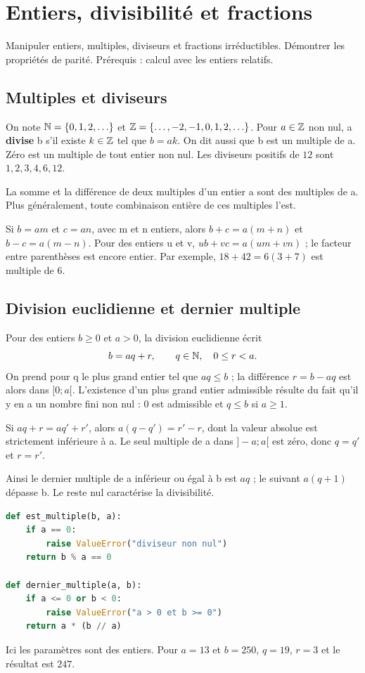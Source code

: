 \documentclass[../cours_2de.tex]{subfiles}
\begin{document}
\setcounter{chapter}{1}
\chapter{Entiers, divisibilité et fractions}
\label{sec:ch02}
\begin{objectif}
Manipuler entiers, multiples, diviseurs et fractions irréductibles. Démontrer les propriétés de parité. Prérequis : calcul avec les entiers relatifs.
\end{objectif}
\section{Multiples et diviseurs}
On note $\mathbb{N}=\{0,1,2,\ldots\}$ et $\mathbb{Z}=\{\ldots,-2,-1,0,1,2,\ldots\}$. Pour $a\in\mathbb{Z}$ non nul, a \textbf{divise} b s'il existe $k\in\mathbb{Z}$ tel que $b=ak$. On dit aussi que b est un multiple de a. Zéro est un multiple de tout entier non nul. Les diviseurs positifs de $12$ sont $1,2,3,4,6,12$.

\begin{propriete}
La somme et la différence de deux multiples d'un entier a sont des multiples de a. Plus généralement, toute combinaison entière de ces multiples l'est.
\end{propriete}
\begin{demonstration}
Si $b=am$ et $c=an$, avec m et n entiers, alors $b+c=a(m+n)$ et $b-c=a(m-n)$. Pour des entiers u et v, $ub+vc=a(um+vn)$ ; le facteur entre parenthèses est encore entier. Par exemple, $18+42=6(3+7)$ est multiple de $6$.
\end{demonstration}
\section{Division euclidienne et dernier multiple}
Pour des entiers $b\ge0$ et $a>0$, la division euclidienne écrit
\[
b=aq+r,\qquad q\in\mathbb{N},\quad 0\le r<a.
\]
On prend pour q le plus grand entier tel que $aq\le b$ ; la différence $r=b-aq$ est alors dans $[0;a[$. L'existence d'un plus grand entier admissible résulte du fait qu'il y en a un nombre fini non nul : $0$ est admissible et $q\le b$ si $a\ge1$.
\begin{demonstration}[unicité]
Si $aq+r=aq'+r'$, alors $a(q-q')=r'-r$, dont la valeur absolue est strictement inférieure à a. Le seul multiple de a dans $]-a;a[$ est zéro, donc $q=q'$ et $r=r'$.
\end{demonstration}
Ainsi le dernier multiple de a inférieur ou égal à b est $aq$ ; le suivant $a(q+1)$ dépasse b. Le reste nul caractérise la divisibilité.
\begin{lstlisting}[language=Python]
def est_multiple(b, a):
    if a == 0:
        raise ValueError("diviseur non nul")
    return b % a == 0

def dernier_multiple(a, b):
    if a <= 0 or b < 0:
        raise ValueError("a > 0 et b >= 0")
    return a * (b // a)
\end{lstlisting}
Ici les paramètres sont des entiers. Pour $a=13$ et $b=250$, $q=19$, $r=3$ et le résultat est $247$.
\end{document}
